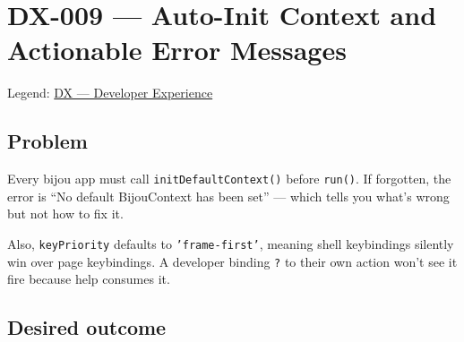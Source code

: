 \chapter{DX-009 --- Auto-Init Context and Actionable Error Messages}\label{record-314}

\smallskip

Legend: \href{https://github.com/flyingrobots/bijou/blob/cbd70612140e7a450d764b3c7be1c6af878b99bc/docs/method/graveyard/legends/DX-developer-experience.md}{DX --- Developer Experience}

\section{Problem}\label{record-314-problem}

Every bijou app must call \texttt{i\allowbreak{}n\allowbreak{}i\allowbreak{}t\allowbreak{}D\allowbreak{}e\allowbreak{}f\allowbreak{}a\allowbreak{}u\allowbreak{}l\allowbreak{}t\allowbreak{}C\allowbreak{}o\allowbreak{}n\allowbreak{}t\allowbreak{}e\allowbreak{}x\allowbreak{}t\allowbreak{}(\allowbreak{})} before \texttt{r\allowbreak{}u\allowbreak{}n\allowbreak{}(\allowbreak{})}. If forgotten, the error is ``No default BijouContext has been set'' --- which tells you what's wrong but not how to fix it.

Also, \texttt{k\allowbreak{}e\allowbreak{}y\allowbreak{}P\allowbreak{}r\allowbreak{}i\allowbreak{}o\allowbreak{}r\allowbreak{}i\allowbreak{}t\allowbreak{}y} defaults to \texttt{'\allowbreak{}f\allowbreak{}r\allowbreak{}a\allowbreak{}m\allowbreak{}e\allowbreak{}-\allowbreak{}f\allowbreak{}i\allowbreak{}r\allowbreak{}s\allowbreak{}t\allowbreak{}'}, meaning shell keybindings silently win over page keybindings. A developer binding \texttt{?} to their own action won't see it fire because help consumes it.

\section{Desired outcome}\label{record-314-desired-outcome}

